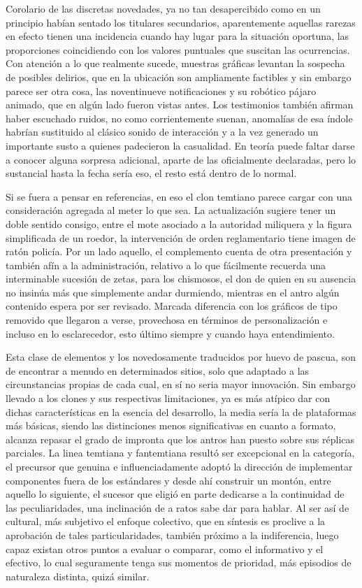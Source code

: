 \documentclass[
]{book}
\begin{document}
Corolario de las discretas novedades, ya no tan desapercibido como en un principio habían sentado los titulares secundarios, aparentemente aquellas rarezas en efecto tienen una incidencia cuando hay lugar para la situación oportuna, las proporciones coincidiendo con los valores puntuales que suscitan las ocurrencias. Con atención a lo que realmente sucede, muestras gráficas levantan la sospecha de posibles delirios, que en la ubicación son ampliamente factibles y sin embargo parece ser otra cosa, las noventinueve notificaciones y su robótico pájaro animado, que en algún lado fueron vistas antes. Los testimonios también afirman haber escuchado ruidos, no como corrientemente suenan, anomalías de esa índole habrían sustituido al clásico sonido de interacción y a la vez generado un importante susto a quienes padecieron la casualidad. En teoría puede faltar darse a conocer alguna sorpresa adicional, aparte de las oficialmente declaradas, pero lo sustancial hasta la fecha sería eso, el resto está dentro de lo normal.

Si se fuera a pensar en referencias, en eso el clon temtiano parece cargar con una consideración agregada al meter lo que sea. La actualización sugiere tener un doble sentido consigo, entre el mote asociado a la autoridad miliquera y la figura simplificada de un roedor, la intervención de orden reglamentario tiene imagen de ratón policía. Por un lado aquello, el complemento cuenta de otra presentación y también afín a la administración, relativo a lo que fácilmente recuerda una interminable sucesión de zetas, para los chismosos, el don de quien en su ausencia no insinúa más que simplemente andar durmiendo, mientras en el antro algún contenido espera por ser revisado. Marcada diferencia con los gráficos de tipo removido que llegaron a verse, provechosa en términos de personalización e incluso en lo esclarecedor, esto último siempre y cuando haya entendimiento.

Esta clase de elementos y los novedosamente traducidos por huevo de pascua, son de encontrar a menudo en determinados sitios, solo que adaptado a las circunstancias propias de cada cual, en sí no seria mayor innovación. Sin embargo llevado a los clones y sus respectivas limitaciones, ya es más atípico dar con dichas características en la esencia del desarrollo, la media sería la de plataformas más básicas, siendo las distinciones menos significativas en cuanto a formato, alcanza repasar el grado de impronta que los antros han puesto sobre sus réplicas parciales. La linea temtiana y fantemtiana resultó ser excepcional en la categoría, el precursor que genuina e influenciadamente adoptó la dirección de implementar componentes fuera de los estándares y desde ahí construir un montón, entre aquello lo siguiente, el sucesor que eligió en parte dedicarse a la continuidad de las peculiaridades, una inclinación de a ratos sabe dar para hablar. Al ser así de cultural, más subjetivo el enfoque colectivo, que en síntesis es proclive a la aprobación de tales particularidades, también próximo a la indiferencia, luego capaz existan otros puntos a evaluar o comparar, como el informativo y el efectivo, lo cual seguramente tenga sus momentos de prioridad, más episodios de naturaleza distinta, quizá similar.
\end{document}
